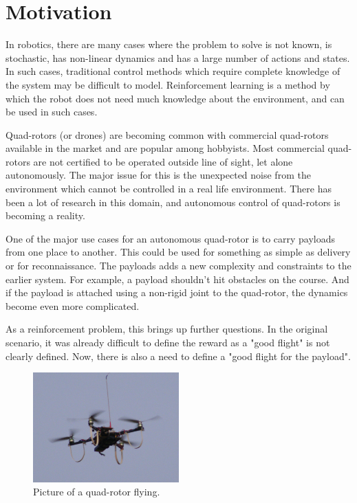 \documentclass[hidelinks,BTech]{iitmdiss}
\begin{document}
\section{Motivation}

In robotics, there are many cases where the problem to solve is not known, is stochastic, has non-linear dynamics and has a large number of actions and states. In such cases, traditional control methods which require complete knowledge of the system may be difficult to model. Reinforcement learning is a method by which the robot does not need much knowledge about the environment, and can be used in such cases.

Quad-rotors (or drones) are becoming common with commercial quad-rotors available in the market and are popular among hobbyists. Most commercial quad-rotors are not certified to be operated outside line of sight, let alone autonomously. The major issue for this is the unexpected noise from the environment which cannot be controlled in a real life environment. There has been a lot of research in this domain, and autonomous control of quad-rotors is becoming a reality.

One of the major use cases for an autonomous quad-rotor is to carry payloads from one place to another. This could be used for something as simple as delivery or for reconnaissance. The payloads adds a new complexity and constraints to the earlier system. For example, a payload shouldn't hit obstacles on the course. And if the payload is attached using a non-rigid joint to the quad-rotor, the dynamics become even more complicated.

As a reinforcement problem, this brings up further questions. In the original scenario, it was already difficult to define the reward as a "good flight" is not clearly defined. Now, there is also a need to define a "good flight for the payload".

\begin{figure}[H]
  \centering
    \includegraphics[width=0.5\textwidth]{quadrotor.jpg}
    \caption{Picture of a quad-rotor flying.}
\end{figure}
\end{document}
